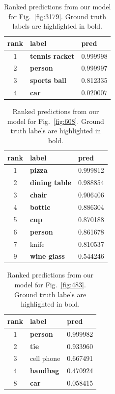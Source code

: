 \documentclass[12pt,journal,compsoc]{IEEEtran}
\begin{document}
\begin{table}
\caption{Ranked predictions from our model for Fig.~\ref{fig:3179}. Ground truth labels are highlighted in bold.}
\label{tab:3179}
\centering
\begin{tabular}{cll}
\toprule
rank &               label & pred \\
\midrule
1 & \textbf{tennis racket} & 0.999998 \\
2 &        \textbf{person} & 0.999997 \\
3 &   \textbf{sports ball} & 0.812335 \\
4 &           \textbf{car} & 0.020007 \\
\bottomrule
\end{tabular}
\end{table}

\begin{table}
\caption{Ranked predictions from our model for Fig.~\ref{fig:608}. Ground truth labels are highlighted in bold.}
\label{tab:608}
\centering
\begin{tabular}{cll}
\toprule
rank &              label & pred \\
\midrule
1 &        \textbf{pizza} & 0.999812 \\
2 & \textbf{dining table} & 0.988854 \\
3 &        \textbf{chair} & 0.906406 \\
4 &       \textbf{bottle} & 0.886304 \\
5 &          \textbf{cup} & 0.870188 \\
6 &       \textbf{person} & 0.861678 \\
7 &                 knife & 0.810537 \\
9 &   \textbf{wine glass} & 0.544246 \\
\bottomrule
\end{tabular}
\end{table}

\begin{table}
\caption{Ranked predictions from our model for Fig.~\ref{fig:483}. Ground truth labels are highlighted in bold.}
\label{tab:483}
\centering
\begin{tabular}{cll}
\toprule
rank &         label & pred \\
\midrule
1 &  \textbf{person} & 0.999982 \\
2 &     \textbf{tie} & 0.933960 \\
3 &       cell phone & 0.667491 \\
4 & \textbf{handbag} & 0.470924 \\
8 &     \textbf{car} & 0.058415 \\
\bottomrule
\end{tabular}
\end{table}
\end{document}
